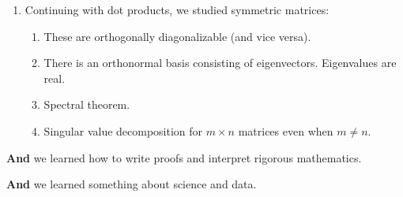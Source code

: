\begin{enumerate}
\begin{enumerate}
            \item Gram-Schmidt algorithm.
            \item Least squares and finding the closest vector in a subspace.
        \end{enumerate}
        \item Continuing with dot products, we studied symmetric matrices:
        \begin{enumerate}
            \item These are orthogonally diagonalizable (and vice versa).
            \item There is an orthonormal basis consisting of eigenvectors. Eigenvalues are real.
            \item Spectral theorem.
            \item Singular value decomposition for $m \times n$ matrices even when $m \neq n$.
        \end{enumerate}
    \end{enumerate}


     \textbf{And} we learned how to write proofs and interpret rigorous mathematics.
    
     \textbf{And} we learned something about science and data.



%
